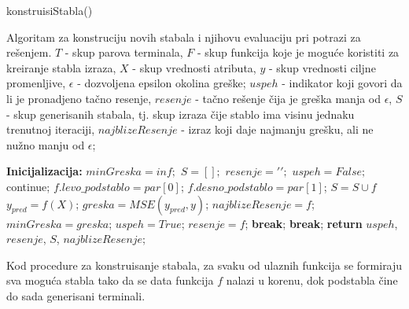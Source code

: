 \documentclass[main.tex]{subfiles}
\begin{document}
\begin{algorithm}
\caption{konstruisiStabla()}
\label{alg:buildTree}
  \begin{algorithmic}[1]
    \DESCRIPTION Algoritam za konstruciju novih stabala i njihovu evaluaciju pri potrazi za rešenjem.
    \INPUT $T$ - skup parova terminala, $F$ - skup funkcija koje je moguće koristiti za kreiranje stabla izraza,  $X$ - skup vrednosti atributa, $y$ - skup vrednosti ciljne promenljive, 
    $\epsilon$ - dozvoljena epsilon okolina greške;
    \OUTPUT $uspeh$ - indikator koji govori da li je pronadjeno tačno resenje, $resenje$ - tačno rešenje čija je greška manja od $\epsilon$, $S$ - skup generisanih stabala, tj. skup izraza čije stablo ima visinu jednaku trenutnoj iteraciji, $najblizeResenje$ - izraz koji daje najmanju grešku, ali ne nužno manju od $\epsilon$;
    
    \STATE \textbf{Inicijalizacija:} $minGreska = inf;$ $S = [];$ $resenje = {}' {}'; $ $uspeh = False;$
                    \STATE continue;
                \ENDIF
            \ENDIF
            \STATE $f.levo\_podstablo = par[0]$;
                \STATE $f.desno\_podstablo = par[1]$;
            \ENDIF 
            \STATE $S = S \cup f$
            \STATE $y_{pred} = f(X)$;
            \STATE $greska = MSE(y_{pred}, y) $;
                \STATE $najblizeResenje = f$;
                \STATE $minGreska = greska$;
            \ENDIF 
                \STATE $uspeh = True$;
                \STATE $resenje = f$;
                \STATE \textbf{break};
            \ENDIF 
        \ENDFOR
            \STATE \textbf{break};
        \ENDIF
    \ENDFOR
    \STATE \textbf{return} $uspeh$, $resenje$, $S$, $najblizeResenje$;
  \end{algorithmic}
\end{algorithm}

Kod procedure za konstruisanje stabala, za svaku od ulaznih funkcija se formiraju sva moguća stabla tako da se data funkcija $f$ nalazi u korenu, dok podstabla čine do sada generisani terminali. 
\end{document}

